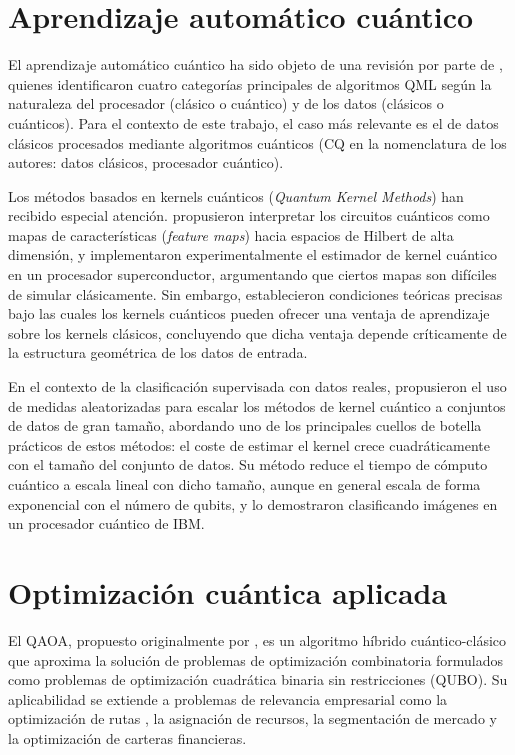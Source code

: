 \section{Aprendizaje automático cuántico}

El aprendizaje automático cuántico ha sido objeto de una revisión por parte de \cite{biamonte2017}, quienes identificaron cuatro categorías principales de algoritmos QML según la naturaleza del procesador (clásico o cuántico) y de los datos (clásicos o cuánticos). Para el contexto de este trabajo, el caso más relevante es el de datos clásicos procesados mediante algoritmos cuánticos (CQ en la nomenclatura de los autores: datos clásicos, procesador cuántico).

Los métodos basados en kernels cuánticos (\textit{Quantum Kernel Methods}) han recibido especial atención. \cite{schuld2021} propusieron interpretar los circuitos cuánticos como mapas de características (\textit{feature maps}) hacia espacios de Hilbert de alta dimensión, y \cite{havlicek2019} implementaron experimentalmente el estimador de kernel cuántico en un procesador superconductor, argumentando que ciertos mapas son difíciles de simular clásicamente. Sin embargo, \cite{huang2021} establecieron condiciones teóricas precisas bajo las cuales los kernels cuánticos pueden ofrecer una ventaja de aprendizaje sobre los kernels clásicos, concluyendo que dicha ventaja depende críticamente de la estructura geométrica de los datos de entrada.

En el contexto de la clasificación supervisada con datos reales, \cite{haug2023} propusieron el uso de medidas aleatorizadas para escalar los métodos de kernel cuántico a conjuntos de datos de gran tamaño, abordando uno de los principales cuellos de botella prácticos de estos métodos: el coste de estimar el kernel crece cuadráticamente con el tamaño del conjunto de datos. Su método reduce el tiempo de cómputo cuántico a escala lineal con dicho tamaño, aunque en general escala de forma exponencial con el número de qubits, y lo demostraron clasificando imágenes en un procesador cuántico de IBM.

\section{Optimización cuántica aplicada}

El QAOA, propuesto originalmente por \cite{farhi2014}, es un algoritmo híbrido cuántico-clásico que aproxima la solución de problemas de optimización combinatoria formulados como problemas de optimización cuadrática binaria sin restricciones (QUBO). Su aplicabilidad se extiende a problemas de relevancia empresarial como la optimización de rutas \citep{lucas2014}, la asignación de recursos, la segmentación de mercado y la optimización de carteras financieras.

